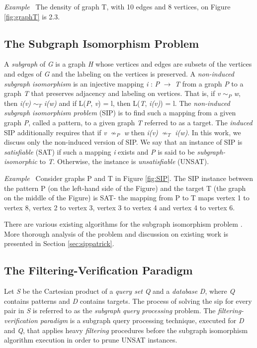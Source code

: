 \documentclass{l4proj}
\newcounter{example}[section]
\newenvironment{example}[1][]{\refstepcounter{example}\par\medskip
   \noindent \textit{Example~\theexample #1} \rmfamily}{\medskip}
\begin{document}
\begin{example}
The density of graph T, with 10 edges and 8 vertices, on Figure \ref{fig:graphT} is 2.3. %
\end{example}

\subsection{The Subgraph Isomorphism Problem}
A \emph{subgraph} of \emph{G} is a graph \emph{H} whose vertices and edges are subsets of the vertices and edges of \emph{G} and the labeling on the vertices is preserved.
A \emph{non-induced subgraph isomorphism} is an injective mapping \emph{i} : \emph{P} $\rightarrow$ \emph{T} from a graph \emph{P} to a graph \emph{T} that preserves adjacency and labeling on vertices. That is, if \emph{v} $\sim_{P}$ \emph{w}, then \emph{i(v)} $\sim_{T}$ \emph{i(w)} and if L(\emph{P}, \emph{v}) = l, then L(\emph{T}, \emph{i(v)}) = l. The \emph{non-induced subgraph isomorphism problem} (SIP) is to find such a mapping from a given graph \emph{P}, called a pattern, to a given graph \emph{T} referred to as a target. The \emph{induced} SIP additionally requires that if \emph{v} $\nsim_{P}$ \emph{w} then \emph{i(v)} $\nsim_{T}$ \emph{i(w)}. In this work, we discuss only the non-induced version of SIP. We say that an instance of SIP is \emph{satisfiable} (SAT) if such a mapping \emph{i} exists and \emph{P} is said to be \emph{subgraph-isomorphic} to \emph{T}. Otherwise, the instance is \emph{unsatisfiable} (UNSAT).

\begin{example}
\label{ex:sip}
Consider graphs P and T in Figure \ref{fig:SIP}. The SIP instance between the pattern P (on the left-hand side of the Figure) and the target T (the graph on the middle of the Figure) is SAT- the mapping from P to T maps vertex 1 to vertex 8, vertex 2 to vertex 3, vertex 3 to vertex 4 and vertex 4 to vertex 6.
\end{example}

There are various existing algorithms for the subgraph isomorphism problem \cite{vf2,Solnon:2010,CP2015,Larrosa:2002,Bonnici:2013,Zampelli:2010,nauty}. More thorough analysis of the problem and discussion on existing work is presented in Section \ref{sec:sippatrick}.

\subsection{The Filtering-Verification Paradigm}
Let \emph{S} be the Cartesian product of a \emph{query set} \emph{Q} and a \emph{database} \emph{D}, where \emph{Q} contains patterns and \emph{D} contains targets. The process of solving the \gls{sip} for every pair in \emph{S} is referred to as the \emph{subgraph query processing} problem. The \emph{filtering-verification paradigm} is a subgraph query processing technique, executed for \emph{D} and \emph{Q}, that applies heavy \emph{filtering} procedures before the subgraph isomorphism algorithm execution in order to prune UNSAT instances.
\end{document}
